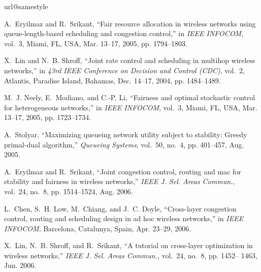 \documentclass[conference]{IEEEtran}
\begin{document}
\begin{thebibliography}{10}
\providecommand{\url}[1]{#1}
\csname url@samestyle\endcsname
\providecommand{\newblock}{\relax}
\providecommand{\bibinfo}[2]{#2}
\providecommand{\BIBentrySTDinterwordspacing}{\spaceskip=0pt\relax}
\providecommand{\BIBentryALTinterwordstretchfactor}{4}
\providecommand{\BIBentryALTinterwordspacing}{\spaceskip=\fontdimen2\font plus
\BIBentryALTinterwordstretchfactor\fontdimen3\font minus
  \fontdimen4\font\relax}
\providecommand{\BIBforeignlanguage}[2]{{\expandafter\ifx\csname l@#1\endcsname\relax
\typeout{** WARNING: IEEEtran.bst: No hyphenation pattern has been}\typeout{** loaded for the language `#1'. Using the pattern for}\typeout{** the default language instead.}\else
\language=\csname l@#1\endcsname
\fi
#2}}
\providecommand{\BIBdecl}{\relax}
\BIBdecl

A.~Eryilmaz and R.~Srikant, ``Fair resource allocation in wireless networks
  using queue-length-based scheduling and congestion control,'' in \emph{{IEEE}
  {INFOCOM}}, vol.~3, Miami, FL, USA, Mar. 13--17, 2005, pp. 1794--1803.

X.~Lin and N.~B. Shroff, ``Joint rate control and scheduling in multihop
  wireless networks,'' in \emph{43rd IEEE Conference on Decision and Control
  ({CDC})}, vol.~2, Atlantis, Paradise Island, Bahamas, Dec. 14--17, 2004, pp.
  1484--1489.

M.~J. Neely, E.~Modiano, and C.-P. Li, ``Fairness and optimal stochastic
  control for heterogeneous networks,'' in \emph{{IEEE} {INFOCOM}}, vol.~3,
  Miami, FL, USA, Mar. 13--17, 2005, pp. 1723--1734.

A.~Stolyar, ``Maximizing queueing network utility subject to stability: Greedy
  primal-dual algorithm,'' \emph{Queueing Systems}, vol.~50, no.~4, pp.
  401--457, Aug. 2005.

A.~Eryilmaz and R.~Srikant, ``Joint congestion control, routing and mac for
  stability and fairness in wireless networks,'' \emph{{IEEE} J. Sel. Areas
  Commun.}, vol.~24, no.~8, pp. 1514--1524, Aug. 2006.

L.~Chen, S.~H. Low, M.~Chiang, and J.~C. Doyle, ``Cross-layer congestion
  control, routing and scheduling design in ad hoc wireless networks,'' in
  \emph{{IEEE} {INFOCOM}}, Barcelona, Catalunya, Spain, Apr. 23--29, 2006.

X.~Lin, N.~B. Shroff, and R.~Srikant, ``A tutorial on cross-layer optimization
  in wireless networks,'' \emph{{IEEE} J. Sel. Areas Commun.}, vol.~24, no.~8,
  pp. 1452-- 1463, Jun. 2006.


\end{thebibliography}
\end{document}
